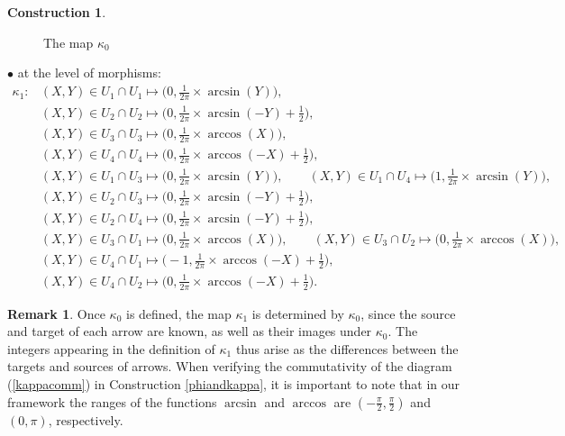 \documentclass{article}
\theoremstyle{plain}
\theoremstyle{definition}
\newtheorem{rem}[thm]{Remark}
\newtheorem{const}[thm]{Construction}
\begin{document}
\begin{const}
\begin{figure}[H]
\begin{tikzpicture}
\end{tikzpicture}
\caption{The map $\kappa_0$}
\end{figure}
$\bullet$ at the level of morphisms:
\begin{align*}
\kappa_1: & (X,Y) \in U_1 \cap U_1 \mapsto \big(0,\frac{1}{2\pi} \times \arcsin(Y)\big), \\ & (X,Y) \in U_2 \cap U_2 \mapsto \big(0,\frac{1}{2\pi} \times \arcsin(-Y) + \frac{1}{2}\big), \\ & (X,Y) \in U_3 \cap U_3 \mapsto \big(0,\frac{1}{2\pi} \times \arccos(X)\big), \\\  & (X,Y) \in U_4 \cap U_4 \mapsto \big(0,\frac{1}{2\pi} \times \arccos(-X)+\frac{1}{2}\big), \\ & (X,Y) \in U_1 \cap U_3 \mapsto \big(0,\frac{1}{2\pi} \times \arcsin(Y)\big), \qquad (X,Y) \in U_1 \cap U_4 \mapsto \big(1,\frac{1}{2\pi} \times \arcsin(Y)\big), \\ & (X,Y) \in U_2 \cap U_3 \mapsto \big(0,\frac{1}{2\pi} \times \arcsin(-Y)+\frac{1}{2}\big), \\ & (X,Y) \in U_2 \cap U_4 \mapsto \big(0,\frac{1}{2\pi} \times \arcsin(-Y)+\frac{1}{2}\big), \\ & (X,Y) \in U_3 \cap U_1 \mapsto \big(0,\frac{1}{2\pi} \times \arccos(X)\big), \qquad (X,Y) \in U_3 \cap U_2 \mapsto \big(0,\frac{1}{2\pi} \times \arccos(X)\big), \\ & (X,Y) \in U_4 \cap U_1 \mapsto \big(-1,\frac{1}{2\pi} \times \arccos(-X)+\frac{1}{2}\big), \\
& (X,Y) \in U_4 \cap U_2 \mapsto \big(0,\frac{1}{2\pi} \times \arccos(-X) + \frac{1}{2}\big).
\end{align*}
\begin{rem}
Once $\kappa_0$ is defined, the map $\kappa_1$ is determined by $\kappa_0$, since the source and target of each arrow are known, as well as their images under $\kappa_0$. The integers appearing in the definition of $\kappa_1$ thus arise as the differences between the targets and sources of arrows. When verifying the commutativity of the diagram (\ref{kappacomm}) in Construction \ref{phiandkappa}, it is important to note that in our framework the ranges of the functions $\arcsin$ and $\arccos$ are $(-\frac{\pi}{2},\frac{\pi}{2})$ and $(0,\pi)$, respectively.
\end{rem}
\begin{figure}[H]
\centering
\begin{tikzpicture}


\end{tikzpicture}
\end{figure}
\end{const}
\end{document}
